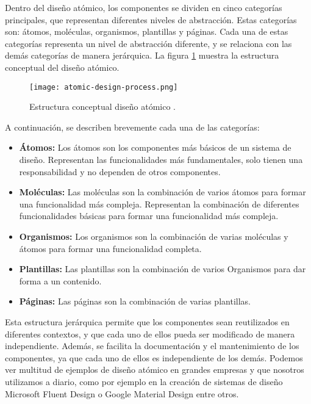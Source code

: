 Dentro del diseño atómico, los componentes se dividen en cinco categorías
principales, que representan diferentes niveles de abstracción. Estas categorías
son: átomos, moléculas, or\-ga\-nis\-mos, plantillas y páginas. Cada una de estas
categorías representa un nivel de abstracción diferente, y se relaciona con
las demás categorías de manera jerárquica. La figura \ref{fig:atomic-design}
muestra la estructura conceptual del diseño atómico.\medskip

\begin{figure}[ht]
    \centering
    \texttt{[image: atomic-design-process.png]}
    \caption{Estructura conceptual diseño atómico \cite{frost2016atomic}.}\label{fig:atomic-design}
\end{figure}

A continuación, se describen brevemente cada una de las categorías:
\begin{itemize}
    \item \textbf{Átomos:} Los átomos son los componentes más básicos de un sistema
    de diseño. Representan las funcionalidades más fundamentales, solo tienen
    una responsabilidad y no dependen de otros componentes.
    \item \textbf{Moléculas:} Las moléculas son la combinación de varios átomos
    para formar una funcionalidad más compleja. Representan la combinación de
    diferentes funcionalidades básicas para formar una funcionalidad más compleja.
    \item \textbf{Organismos:} Los organismos son la combinación de varias moléculas
    y átomos para formar una funcionalidad completa.
    \item \textbf{Plantillas:} Las plantillas son la combinación de varios Organismos
    para dar forma a un contenido.
    \item \textbf{Páginas:} Las páginas son la combinación de varias plantillas.
\end{itemize}

Esta estructura jerárquica permite que los componentes sean reutilizados en
diferentes contextos, y que cada uno de ellos pueda ser modificado de manera
independiente. Además, se facilita la documentación y el mantenimiento de los
componentes, ya que cada uno de ellos es independiente de los demás. Podemos
ver multitud de ejemplos de diseño atómico en grandes empresas y que nosotros utilizamos
a diario, como por ejemplo en la creación de sistemas de diseño Microsoft Fluent
Design o Google Material Design entre otros.\medskip

